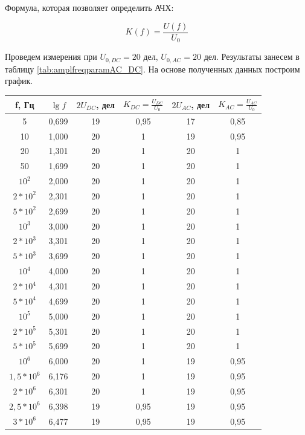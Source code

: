 \documentclass[12pt,a4paper]{article}
\begin{document}
	Формула, которая позволяет определить АЧХ:
	
	$$ K(f) = \frac{U(f)}{U_{0}} $$
		
		Проведем измерения при $ U_{0,DC} = 20 $ дел, $ U_{0,AC} = 20 $ дел. Результаты занесем в таблицу  \ref{tab:amplfreqparamAC_DC}. На основе полученных данных построим график.
		
		\begin{table}[t]
			\begin{center}
				\begin{tabular}{|c|c|c|c|c|c|}
				\hline
f, Гц & $\lg{f}$  & $2U_{DC}$, дел & $K_{DC} = \frac{U_{DC}}{U_{0}}$ & $2U_{AC}$, дел & $K_{AC} = \frac{U_{AC}}{U_{0}}$ \\ \hline
5   & 0,699 & 19  & 0,95 & 17  & 0,85    \\ \hline
10  & 1,000 & 20  & 1 & 19  & 0,95    \\ \hline
20  & 1,301 & 20  & 1 & 20 & 1 \\ \hline
50  & 1,699 & 20   & 1 & 20  & 1 \\ \hline
$10^{2}     $& 2,000 & 20  & 1 & 20  & 1 \\ \hline
$2*10^{2}   $& 2,301 & 20  & 1 & 20  & 1 \\ \hline
$5*10^{2}   $& 2,699 & 20  & 1 & 20  & 1 \\ \hline
$10^{3}     $& 3,000 & 20  & 1 & 20  & 1 \\ \hline
$2*10^{3}   $& 3,301 & 20  & 1 & 20  & 1 \\ \hline
$5*10^{3}   $& 3,699 & 20  & 1 & 20  & 1 \\ \hline
$10^{4}     $& 4,000 & 20  & 1 & 20  & 1 \\ \hline
$2*10^{4}   $& 4,301 & 20  & 1 & 20  & 1 \\ \hline
$5*10^{4}   $& 4,699 & 20  & 1 & 20  & 1 \\ \hline
$10^{5}     $& 5,000 & 20  & 1 & 20  & 1 \\ \hline
$2*10^{5}   $& 5,301 & 20  & 1 & 20  & 1 \\ \hline
$5*10^{5}   $& 5,699 & 20  & 1 & 20  & 1 \\ \hline
$10^{6}     $& 6,000 & 20  & 1 & 19  & 0,95    \\ \hline
$1,5*10^{6} $& 6,176 & 20  & 1 & 19  & 0,95    \\ \hline
$2*10^{6}   $& 6,301 & 20  & 1 & 19  & 0,95    \\ \hline
$2,5*10^{6} $& 6,398 & 19  & 0,95    & 19  & 0,95    \\ \hline
$3*10^{6}   $& 6,477 & 19  & 0,95    & 19  & 0,95    \\ \hline

\end{tabular}
\end{center}
\end{table}
\end{document}

